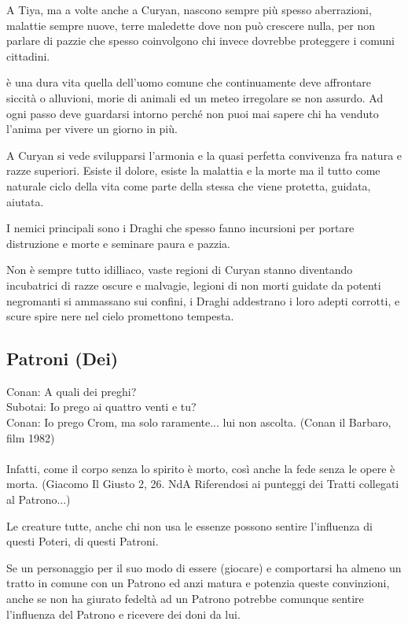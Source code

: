 \documentclass[a4paper,11pt,twoside,openany]{book}
\begin{document}
A Tiya, ma a volte anche a Curyan, nascono sempre più spesso aberrazioni, malattie sempre nuove, terre maledette dove non può crescere nulla, per non parlare di pazzie che spesso coinvolgono chi invece dovrebbe proteggere i comuni cittadini.

è una dura vita quella dell'uomo comune che continuamente deve affrontare siccità o alluvioni, morie di animali ed un meteo irregolare se non assurdo. Ad ogni passo deve guardarsi intorno perché non puoi mai sapere chi ha venduto l'anima per vivere un giorno in più.

A Curyan si vede svilupparsi l'armonia e la quasi perfetta convivenza fra natura e razze superiori. Esiste il dolore, esiste la malattia e la morte ma il tutto come naturale ciclo della vita come parte della stessa che viene protetta, guidata, aiutata.

I nemici principali sono i Draghi che spesso fanno incursioni per portare distruzione e morte e seminare paura e pazzia.

Non è sempre tutto idilliaco, vaste regioni di Curyan stanno diventando incubatrici di razze oscure e malvagie, legioni di non morti guidate da potenti negromanti si ammassano sui confini, i Draghi addestrano i loro adepti corrotti, e scure spire nere nel cielo promettono tempesta.

\pagebreak

\subsection{Patroni (Dei)}

\label{patroni-dei}
\begin{tcolorbox}[enhanced,arc=5pt,boxrule=0.3pt]{
		Conan: A quali dei preghi?\\
		Subotai: Io prego ai quattro venti e tu?\\
		Conan: Io prego Crom, ma solo raramente... lui non ascolta. (Conan il Barbaro, film 1982)\\\\
		Infatti, come il corpo senza lo spirito è morto, così anche la fede senza le opere è morta. (Giacomo Il Giusto 2, 26. NdA Riferendosi ai punteggi dei Tratti collegati al Patrono...)}\end{tcolorbox}\medskip

Le creature tutte, anche chi non usa le essenze possono sentire l'influenza di questi Poteri, di questi Patroni.

Se un personaggio per il suo modo di essere (giocare) e comportarsi ha almeno un tratto in comune con un Patrono ed anzi matura e potenzia queste convinzioni, anche se non ha giurato fedeltà ad un Patrono potrebbe comunque sentire l'influenza del Patrono e ricevere dei doni da lui.
\end{document}
